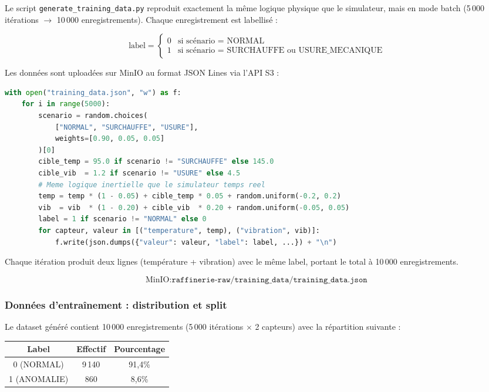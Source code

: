 \documentclass[12pt,a4paper]{article}
\begin{document}
Le script \texttt{generate\_training\_data.py} reproduit exactement la même logique physique que le simulateur, mais en mode batch (5\,000 itérations $\rightarrow$ 10\,000 enregistrements). Chaque enregistrement est labellisé :

\[
\text{label} = \begin{cases}
0 & \text{si scénario = NORMAL} \\
1 & \text{si scénario = SURCHAUFFE ou USURE\_MECANIQUE}
\end{cases}
\]

Les données sont uploadées sur MinIO au format JSON Lines via l'API S3 :

\begin{lstlisting}[language=Python,caption={Génération dataset labeling}]
with open("training_data.json", "w") as f:
    for i in range(5000):
        scenario = random.choices(
            ["NORMAL", "SURCHAUFFE", "USURE"],
            weights=[0.90, 0.05, 0.05]
        )[0]
        cible_temp = 95.0 if scenario != "SURCHAUFFE" else 145.0
        cible_vib  = 1.2 if scenario != "USURE" else 4.5
        # Meme logique inertielle que le simulateur temps reel
        temp = temp * (1 - 0.05) + cible_temp * 0.05 + random.uniform(-0.2, 0.2)
        vib  = vib  * (1 - 0.20) + cible_vib  * 0.20 + random.uniform(-0.05, 0.05)
        label = 1 if scenario != "NORMAL" else 0
        for capteur, valeur in [("temperature", temp), ("vibration", vib)]:
            f.write(json.dumps({"valeur": valeur, "label": label, ...}) + "\n")
\end{lstlisting}

Chaque itération produit deux lignes (température + vibration) avec le même label, portant le total à 10\,000 enregistrements.

\[
\text{MinIO} : \texttt{raffinerie-raw/training\_data/training\_data.json}
\]

\subsubsection{Données d'entraînement : distribution et split}

Le dataset généré contient 10\,000 enregistrements (5\,000 itérations $\times$ 2 capteurs) avec la répartition suivante :

\begin{center}
\begin{tabular}{|c|c|c|}
\hline
\textbf{Label} & \textbf{Effectif} & \textbf{Pourcentage} \\
\hline
0 (NORMAL) & 9\,140 & 91,4\% \\
1 (ANOMALIE) & 860 & 8,6\% \\
\hline
\end{tabular}
\end{center}
\end{document}
